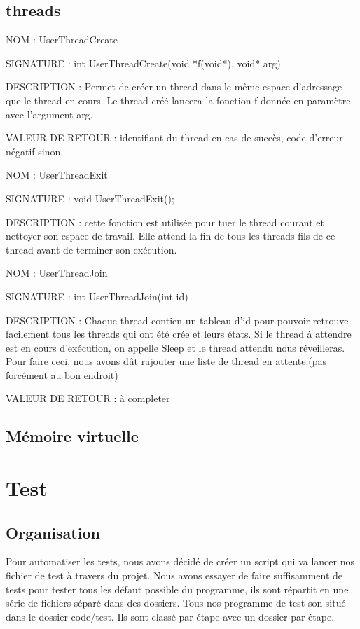 \documentclass{article}
\begin{document}
	\subsection{threads}
	\begin{description}
		\item{NOM : } UserThreadCreate
		\item{SIGNATURE : } int UserThreadCreate(void *f(void*), void* arg)
		\item{DESCRIPTION : } Permet de créer un thread dans le même espace d'adressage que le thread en cours. Le thread créé lancera la fonction f donnée en paramètre avec l'argument arg.
		\item{VALEUR DE RETOUR : } identifiant du thread en cas de succès, code d'erreur négatif sinon.
	\end{description}
	\begin{description}
		\item{NOM : } UserThreadExit
		\item{SIGNATURE : } void UserThreadExit();
		\item{DESCRIPTION : } cette fonction est utilisée pour tuer le thread courant et nettoyer son espace de travail. Elle attend la fin de tous les threads fils de ce thread avant de terminer son exécution.
	\end{description}
	\begin{description}
		\item{NOM : } UserThreadJoin
		\item{SIGNATURE : } int UserThreadJoin(int id)
		\item{DESCRIPTION : } Chaque thread contien un tableau d'id pour pouvoir retrouve facilement tous les threads qui ont été crée et leurs états. Si le thread à attendre est en cours d'exécution, on appelle Sleep et le thread attendu nous réveilleras. Pour faire ceci, nous avons dût rajouter une liste de thread en attente.(pas forcément au bon endroit)
		\item{VALEUR DE RETOUR : } à completer
	\end{description}

	\subsection{Mémoire virtuelle}

\section{Test}
	\subsection{Organisation}
		{Pour automatiser les tests, nous avons décidé de créer un script qui va lancer nos fichier de test à travers du projet.
		Nous avons essayer de faire suffisamment de tests pour tester tous les défaut possible du programme, ils sont répartit en une série de fichiers séparé dans des dossiers.
		Tous nos programme de test son situé dans le dossier code/test. Ils sont classé par étape avec un dossier par étape.}
\end{document}
